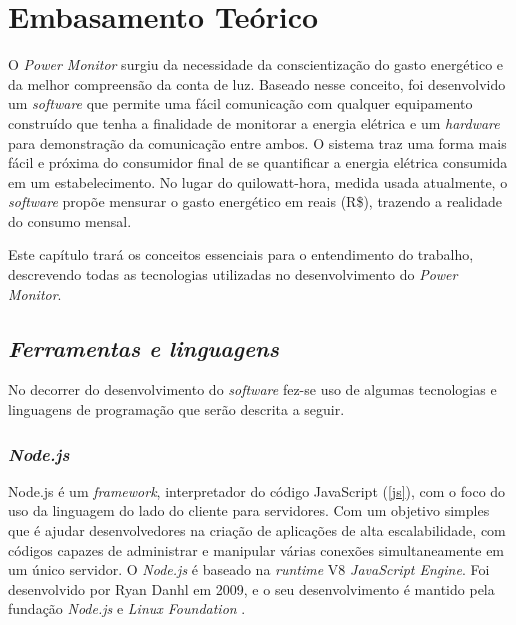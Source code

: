 \chapter[Embasamento Teórico]{Embasamento Teórico}
\label{ch:cap2}
O \textit{Power Monitor} surgiu da necessidade da conscientização do gasto energético e da melhor compreensão da conta de luz. Baseado nesse conceito,
foi desenvolvido um \textit{software} que permite uma fácil comunicação com qualquer equipamento construído que tenha a finalidade de monitorar a energia elétrica e um \textit{hardware} para demonstração
da comunicação entre ambos.
O sistema traz uma forma mais fácil e próxima do consumidor final de se quantificar a energia elétrica consumida em um estabelecimento. No lugar do quilowatt-hora, medida usada atualmente,
o \textit{software} propõe mensurar o gasto energético em reais (R\$), trazendo a realidade do consumo mensal.

Este capítulo trará os conceitos essenciais para o entendimento do trabalho, descrevendo todas as tecnologias utilizadas no desenvolvimento 
do \textit{Power Monitor}.

\section[\textit{Ferramentas e linguagens}]{\textit{Ferramentas e linguagens}}\label{ferramenta-linguagem}
No decorrer do desenvolvimento do \textit{software} fez-se uso de algumas tecnologias e linguagens de programação que serão descrita a seguir.
\subsection[\textit{Node.js}]{\textit{Node.js}}\label{node}
Node.js é um \textit{framework}, interpretador do código JavaScript (\autoref{js}), com o foco do uso da linguagem do lado do cliente para servidores. Com um objetivo simples
que é ajudar desenvolvedores na criação de aplicações de alta escalabilidade, com códigos capazes de administrar e manipular várias conexões simultaneamente
em um único servidor. O \textit{Node.js} é baseado na \textit{runtime} V8 \textit{JavaScript Engine}. Foi desenvolvido por Ryan Danhl em 2009, e o seu desenvolvimento
é mantido pela fundação \textit{Node.js} e \textit{Linux Foundation} \cite{ref-nodejs}. 
